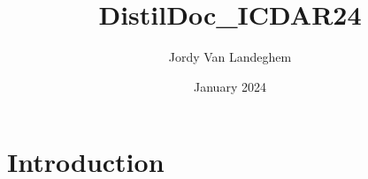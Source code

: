 \documentclass{article}
\title{DistilDoc_ICDAR24}
\author{Jordy Van Landeghem}
\date{January 2024}
\begin{document}
\maketitle

\section{Introduction}
\end{document}

